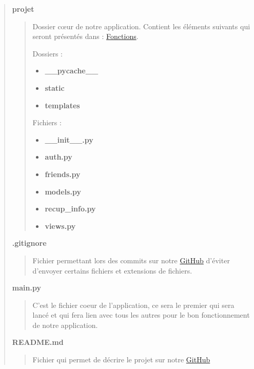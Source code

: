 \documentclass{article}
\begin{document}
\begin{quote}
\begin{quote}
    \end{quote}

    \newpage

    \large{\textbf{projet}}

    \begin{quote}
        Dossier cœur de notre application. Contient les éléments suivants qui seront présentés dans : \hyperref[sec:partieFonctions]{Fonctions}.
    
        Dossiers :
        \begin{itemize}
            \item \textbf{\_\_pycache\_\_}
            \item \textbf{static} 
            \item \textbf{templates} 
        \end{itemize}
        \vspace*{1\baselineskip}
    
        Fichiers :
        \begin{itemize}
            \item \textbf{\_\_init\_\_.py}
            \item \textbf{auth.py} 
            \item \textbf{friends.py} 
            \item \textbf{models.py} 
            \item \textbf{recup\_info.py} 
            \item \textbf{views.py} 
        \end{itemize}
    \end{quote}
    

    \vspace*{1\baselineskip}
    \large{\textbf{.gitignore}}

    \begin{quote}
        Fichier permettant lors des commits sur notre \href{https://github.com/DreanoLucas/Skycord.git}{GitHub}
        d'éviter d'envoyer certains fichiers et extensions de fichiers.
    \end{quote}
    

    \vspace*{1\baselineskip}
    \large{\textbf{main.py}}

    \begin{quote}
        C'est le fichier coeur de l'application, ce sera le premier qui sera lancé et qui fera lien avec tous les autres pour le bon fonctionnement de notre application.
    \end{quote}

    \large{\textbf{README.md}}
    \vspace*{1\baselineskip}

    \begin{quote}
        Fichier qui permet de décrire le projet sur notre \href{https://github.com/DreanoLucas/Skycord.git}{GitHub}
    \end{quote}

\end{quote}
\end{document}
